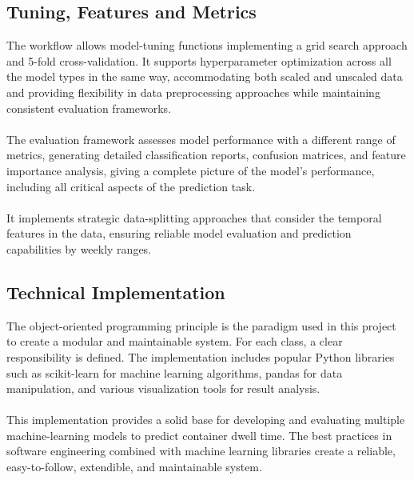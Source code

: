 		\subsection{Tuning, Features and Metrics}
			The workflow allows model-tuning functions implementing a grid search approach and 5-fold cross-validation.
			It supports hyperparameter optimization across all the model types in the same way, accommodating both
			scaled and unscaled data and providing flexibility in data preprocessing approaches while maintaining
			consistent evaluation frameworks.
			\\
			\\
			The evaluation framework assesses model performance with a different range of metrics, generating detailed
			classification reports, confusion matrices, and feature importance analysis, giving a complete picture of
			the model's performance, including all critical aspects of the prediction task.
			\\
			\\
			It implements strategic data-splitting approaches that consider the temporal features in the data, ensuring
			reliable model evaluation and prediction capabilities by weekly ranges.

		\subsection{Technical Implementation}
			The object-oriented programming principle is the paradigm used in this project to create a modular and
			maintainable system. For each class, a clear responsibility is defined. The implementation includes popular
			Python libraries such as scikit-learn for machine learning algorithms, pandas for data manipulation, and
			various visualization tools for result analysis.
			\\
			\\
			This implementation provides a solid base for developing and evaluating multiple machine-learning models to
			predict container dwell time. The best practices in software engineering combined with machine learning
			libraries create a reliable, easy-to-follow, extendible, and maintainable system.